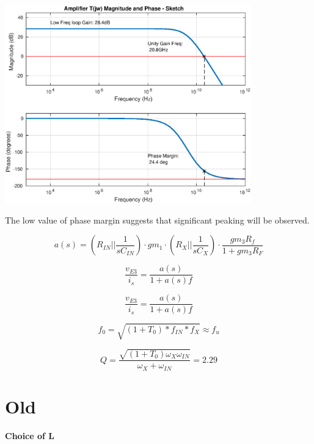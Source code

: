 \documentclass[12pt,a4paper]{article}
\begin{document}
{\centering
	\includegraphics[width=0.8\textwidth]{plots/part_e.eps}
\par}

The low value of phase margin suggests that significant peaking will be observed.

\begin{equation}
  a(s) = (R_{IN} || \frac{1}{sC_{IN}}) \cdot gm_1 \cdot (R_X || \frac{1}{sC_X}) \cdot \frac{gm_3 R_f}{1 + gm_3 R_F}
\end{equation}

\begin{equation}
  \frac{v_{E3}}{i_s} = \frac{a(s)}{1 + a(s) f}
\end{equation}

\begin{equation}
  \frac{v_{E3}}{i_s} = \frac{a(s)}{1 + a(s) f}
\end{equation}

\begin{equation}
  f_{0} = \sqrt{(1+T_0) * f_{IN} * f_{X}} \approx f_u
\end{equation}

\begin{equation}
  Q = \frac{\sqrt{(1 + T_0) \omega_{X} \omega_{IN}}}{\omega_X + \omega_{IN}} = 2.29
\end{equation}









\pagebreak


\section{Old}
\textbf{Choice of L}
\end{document}

